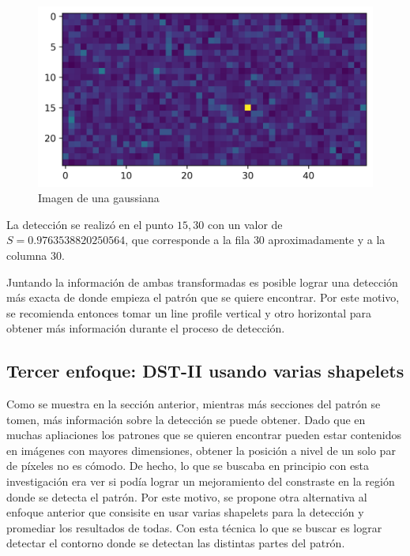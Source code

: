 \begin{figure}\label{fig:gaussian-example-dst-cols}
	\centering
	\includegraphics{Graphics/gaussian-example-dst-cols.png}
	\caption{Imagen de una gaussiana  }
\end{figure}

La detección se realizó en el punto $15, 30$ con un valor de $S=0.9763538820250564$, que corresponde a la fila 
$30$ aproximadamente y a la columna $30$.

Juntando la información de ambas transformadas es posible lograr una detección más exacta de donde empieza el patrón 
que se quiere encontrar. Por este motivo, se recomienda entonces tomar un line profile vertical y otro horizontal
para obtener más información durante el proceso de detección.

\subsection{Tercer enfoque: DST-II usando varias shapelets}

Como se muestra en la sección anterior, mientras más secciones del patrón se tomen, más información sobre la detección se puede
obtener. Dado que en muchas apliaciones los patrones que se quieren encontrar pueden estar contenidos en imágenes
con mayores dimensiones, obtener la posición a nivel de un solo par de píxeles no es cómodo. De hecho, lo que se buscaba en
principio con esta investigación era ver si podía lograr un mejoramiento del constraste en la región donde se detecta el
patrón. Por este motivo, se propone otra alternativa al enfoque anterior que consisite en usar varias shapelets 
para la detección y promediar los resultados de todas. Con esta técnica lo que se buscar es lograr detectar
el contorno donde se detectan las distintas partes del patrón.
